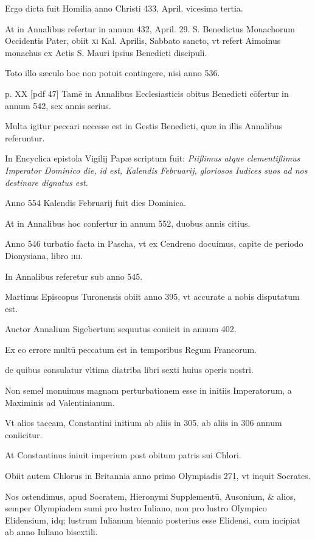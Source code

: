 \begin{parnumbers}
Ergo dicta fuit Homilia anno Christi 433, April. vicesima
tertia.

At in Annalibus refertur in annum 432, April. 29. S. Benedictus
Monachorum Occidentis Pater, obiit \textsc{xi} Kal. Aprilis, Sabbato
sancto, vt refert Aimoinus monachus ex Actis S. Mauri ipsius
Benedicti discipuli.

Toto illo sæculo hoc non potuit contingere, nisi
anno 536.

\clearpage
p. XX [pdf 47]
Tamē in Annalibus Ecclesiasticis obitus Benedicti cōfertur
in annum 542, sex annis serius.

Multa igitur peccari necesse est
in Gestis Benedicti, quæ in illis Annalibus referuntur.

In Encyclica
epistola Vigilij Papæ scriptum fuit: \textit{Piißimus atque clementißimus
Imperator Dominico die, id est, Kalendis Februarij, gloriosos Iudices suos
ad nos destinare dignatus est.}

Anno 554 Kalendis Februarij fuit dies
Dominica.

At in Annalibus hoc confertur in annum 552, duobus
annis citius.

Anno 546 turbatio facta in Pascha, vt ex Cendreno docuimus,
capite de periodo Dionysiana, libro \textsc{iiii}.

In Annalibus referetur
sub anno 545.

Martinus Episcopus Turonensis obiit anno
395, vt accurate a nobis disputatum est.

Auctor Annalium Sigebertum
sequutus coniicit in annum 402.

Ex eo errore multū peccatum
est in temporibus Regum Francorum.

de quibus consulatur vltima
diatriba libri sexti huius operis nostri.

Non semel monuimus magnam
perturbationem esse in initiis Imperatorum, a Maximinis
ad Valentinianum.

Vt alios taceam, Constantini initium ab aliis in
305, ab aliis in 306 annum coniicitur.

At Constantinus iniuit imperium
post obitum patris sui Chlori.

Obiit autem Chlorus in Britannia
anno primo Olympiadis 271, vt inquit Socrates.

Nos ostendimus,
apud Socratem, Hieronymi Supplementū, Ausonium, \& alios,
semper Olympiadem sumi pro lustro Iuliano, non pro lustro Olympico
Elidensium, idq; lustrum Iulianum biennio posterius esse Elidensi,
cum incipiat ab anno Iuliano bisextili.


\end{parnumbers}
